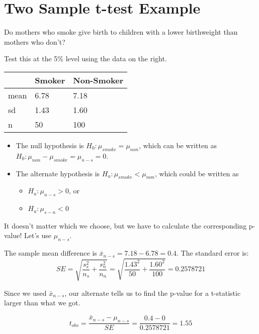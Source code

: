 \documentclass[
  letterpaper,
  DIV=11,
  numbers=noendperiod]{scrreprt}
\providecommand{\tightlist}{%
  \setlength{\itemsep}{0pt}\setlength{\parskip}{0pt}}\usepackage{longtable,booktabs,array}
\def\pause{}
\def\lspace{}
\def\pspace{}
\begin{document}
\hypertarget{two-sample-t-test-example}{%
\section{Two Sample t-test Example}\label{two-sample-t-test-example}}

Do mothers who smoke give birth to children with a lower birthweight
than mothers who don't?

\pspace

Test this at the 5\% level using the data on the right.

\vspace{-7mm}

\begin{longtable}[]{@{}lll@{}}
\toprule\noalign{}
& Smoker & Non-Smoker \\
\midrule\noalign{}
\endhead
\bottomrule\noalign{}
\endlastfoot
mean & 6.78 & 7.18 \\
sd & 1.43 & 1.60 \\
n & 50 & 100 \\
\end{longtable}

\begin{itemize}
\tightlist
\item
  The null hypothesis is \(H_0: \mu_{smoke} = \mu_{non}\), which can be
  written as
  \(H_0: \mu_{non} - \mu_{smoke} = \mu_{n - s} = 0\).\pause\lspace
\item
  The alternate hypothesis is \(H_a: \mu_{smoke} < \mu_{non}\), which
  could be written as

  \begin{itemize}
  \tightlist
  \item
    \(H_a: \mu_{n - s} > 0\), or
  \item
    \(H_a: \mu_{s - n} < 0\)
  \end{itemize}
\end{itemize}

It doesn't matter which we choose, but we have to calculate the
corresponding p-value! Let's use \(\mu_{n-s}\).

The sample mean difference is \(\bar x_{n - s} = 7.18 - 6.78 = 0.4\).
The standard error is: \[
SE = \sqrt{\dfrac{s_s^2}{n_s} + \dfrac{s_n^2}{n_n}} = \sqrt{\dfrac{1.43^2}{50} + \dfrac{1.60^2}{100}} = 0.2578721
\]

Since we used \(\bar x_{n - s}\), our alternate tells us to find the
p-value for a t-statistic larger than what we got.

\[
t_{obs} = \dfrac{\bar x_{n-s} - \mu_{n-s}}{SE} = \dfrac{0.4 - 0}{0.2578721} = 1.55
\]
\end{document}

